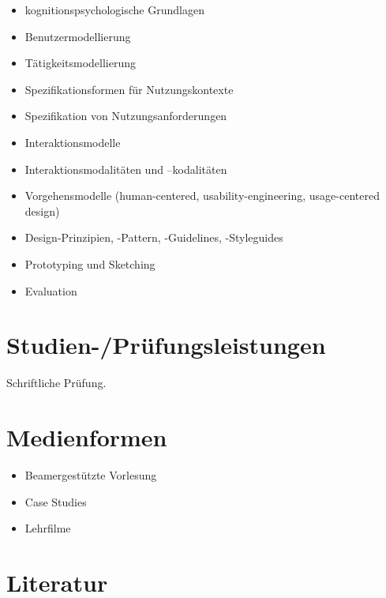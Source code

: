 \begin{itemize}
\tightlist
\item
  kognitionspsychologische Grundlagen
\item
  Benutzermodellierung
\item
  Tätigkeitsmodellierung
\item
  Spezifikationsformen für Nutzungskontexte
\item
  Spezifikation von Nutzungsanforderungen
\item
  Interaktionsmodelle
\item
  Interaktionsmodalitäten und --kodalitäten
\item
  Vorgehensmodelle (human-centered, usability-engineering,
  usage-centered design)
\item
  Design-Prinzipien, -Pattern, -Guidelines, -Styleguides
\item
  Prototyping und Sketching
\item
  Evaluation
\end{itemize}

\section*{Studien-/Prüfungsleistungen\label{/mi-2017/modulbeschreibungen-bachelor/BA_Mensch-Computer_Interaktion}}\label{studien-pruxfcfungsleistungenpathlabelmi-2017modulbeschreibungen-bachelorbaux5fmensch-computerux5finteraktion}

Schriftliche Prüfung.

\section*{Medienformen\label{/mi-2017/modulbeschreibungen-bachelor/BA_Mensch-Computer_Interaktion}}\label{medienformenpathlabelmi-2017modulbeschreibungen-bachelorbaux5fmensch-computerux5finteraktion}

\begin{itemize}
\tightlist
\item
  Beamergestützte Vorlesung
\item
  Case Studies
\item
  Lehrfilme
\end{itemize}

\section*{Literatur\label{/mi-2017/modulbeschreibungen-bachelor/BA_Mensch-Computer_Interaktion}}\label{literaturpathlabelmi-2017modulbeschreibungen-bachelorbaux5fmensch-computerux5finteraktion}


